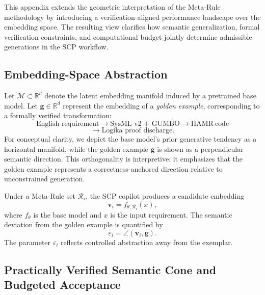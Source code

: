 \documentclass[conference]{IEEEtran}
\begin{document}
This appendix extends the geometric interpretation of the Meta-Rule methodology by introducing a verification-aligned performance landscape over the embedding space. The resulting view clarifies how semantic generalization, formal verification constraints, and computational budget jointly determine admissible generations in the SCP workflow.

\subsection{Embedding-Space Abstraction}

Let $\mathcal{M} \subset \mathbb{R}^d$ denote the latent embedding manifold induced by a pretrained base model. Let $\mathbf{g} \in \mathbb{R}^d$ represent the embedding of a \emph{golden example}, corresponding to a formally verified transformation:
\[
\text{English requirement}
\rightarrow
\text{SysML v2 + GUMBO}
\rightarrow
\text{HAMR}~\text{code}\]
\[\rightarrow
\text{Logika proof discharge}.
\]
For conceptual clarity, we depict the base model’s prior generative tendency as a horizontal manifold, while the golden example $\mathbf{g}$ is shown as a perpendicular semantic direction. This orthogonality is interpretive: it emphasizes that the golden example represents a correctness-anchored direction relative to unconstrained generation.

Under a Meta-Rule set $\mathcal{R}_i$, the SCP copilot produces a candidate embedding
\begin{equation}
\mathbf{v}_i = f_{\theta,\mathcal{R}_i}(x),
\end{equation}
where $f_{\theta}$ is the base model and $x$ is the input requirement. The semantic deviation from the golden example is quantified by
\begin{equation}
\varepsilon_i = \angle(\mathbf{v}_i,\mathbf{g}).
\end{equation}
The parameter $\varepsilon_i$ reflects controlled abstraction away from the exemplar.

\subsection{Practically Verified Semantic Cone and Budgeted Acceptance}
\end{document}
